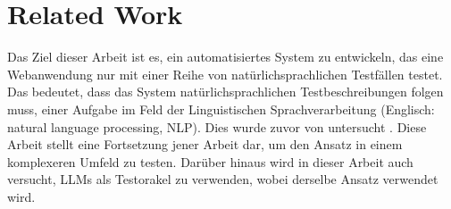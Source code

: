 
\chapter{Related Work}
\label{ch:FirstContent}

Das Ziel dieser Arbeit ist es, ein automatisiertes System zu entwickeln, das eine Webanwendung nur mit einer Reihe von natürlichsprachlichen Testfällen testet.
Das bedeutet, dass das System natürlichsprachlichen Testbeschreibungen folgen muss, einer Aufgabe im Feld der Linguistischen Sprachverarbeitung (Englisch: natural language processing, NLP).
Dies wurde zuvor von  untersucht \cite{GPT3Testing}.
Diese Arbeit stellt eine Fortsetzung jener Arbeit dar, um den Ansatz in einem komplexeren Umfeld zu testen.
Darüber hinaus wird in dieser Arbeit auch versucht, LLMs als Testorakel zu verwenden, wobei derselbe Ansatz verwendet wird.

